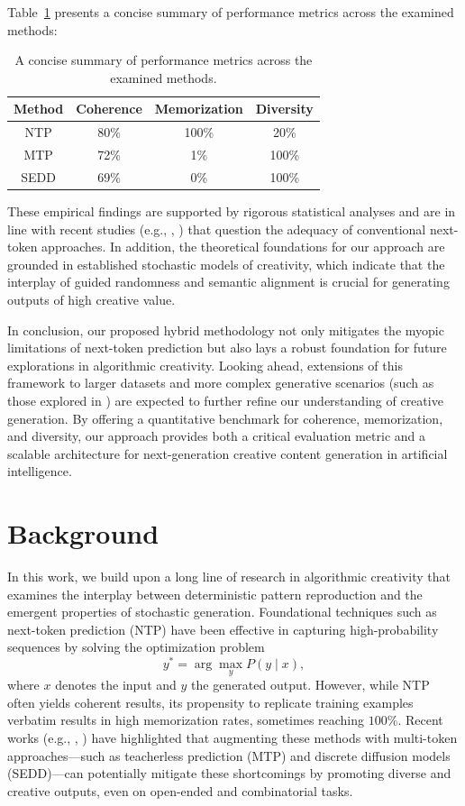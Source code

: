 \documentclass{article} %
\begin{document}
Table~\ref{tab:intro} presents a concise summary of performance metrics across the examined methods:
\begin{table}[h!]
\centering
\caption{A concise summary of performance metrics across the examined methods.}
\label{tab:intro}
\begin{tabular}{|c|c|c|c|}
\hline
\textbf{Method} & \textbf{Coherence} & \textbf{Memorization} & \textbf{Diversity} \\ \hline
NTP  & 80\% & 100\% & 20\% \\ \hline
MTP  & 72\% & 1\%   & 100\% \\ \hline
SEDD & 69\% & 0\%   & 100\% \\ \hline
\end{tabular}
\end{table}

These empirical findings are supported by rigorous statistical analyses and are in line with recent studies (e.g., \cite{nagarajan2025roll}, \cite{saebo2024stochastics}) that question the adequacy of conventional next-token approaches. In addition, the theoretical foundations for our approach are grounded in established stochastic models of creativity, which indicate that the interplay of guided randomness and semantic alignment is crucial for generating outputs of high creative value.

In conclusion, our proposed hybrid methodology not only mitigates the myopic limitations of next-token prediction but also lays a robust foundation for future explorations in algorithmic creativity. Looking ahead, extensions of this framework to larger datasets and more complex generative scenarios (such as those explored in \cite{venkatesh2025crea}) are expected to further refine our understanding of creative generation. By offering a quantitative benchmark for coherence, memorization, and diversity, our approach provides both a critical evaluation metric and a scalable architecture for next-generation creative content generation in artificial intelligence.

\section{Background}
In this work, we build upon a long line of research in algorithmic creativity that examines the interplay between deterministic pattern reproduction and the emergent properties of stochastic generation. Foundational techniques such as next-token prediction (NTP) have been effective in capturing high-probability sequences by solving the optimization problem 
\[
y^* = \arg\max_{y} P(y \mid x),
\]
where \(x\) denotes the input and \(y\) the generated output. However, while NTP often yields coherent results, its propensity to replicate training examples verbatim results in high memorization rates, sometimes reaching \(100\%\). Recent works (e.g., \cite{nagarajan2025roll}, \cite{potraghloo2025top}) have highlighted that augmenting these methods with multi-token approaches—such as teacherless prediction (MTP) and discrete diffusion models (SEDD)—can potentially mitigate these shortcomings by promoting diverse and creative outputs, even on open-ended and combinatorial tasks.
\end{document}
